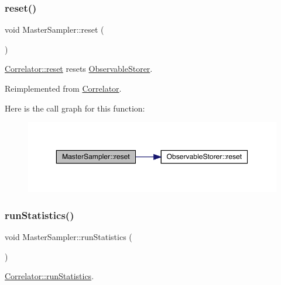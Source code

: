 \subsubsection{\texorpdfstring{reset()}{reset()}}
{\footnotesize\ttfamily void Master\+Sampler\+::reset (\begin{DoxyParamCaption}{ }\end{DoxyParamCaption})\hspace{0.3cm}{\ttfamily [virtual]}}



\mbox{\hyperlink{class_correlator_aacca40262d2cd62f0a3964e832f948c1}{Correlator\+::reset}} resets \mbox{\hyperlink{class_observable_storer}{Observable\+Storer}}. 



Reimplemented from \mbox{\hyperlink{class_correlator_aacca40262d2cd62f0a3964e832f948c1}{Correlator}}.

Here is the call graph for this function\+:
\nopagebreak
\begin{figure}[H]
\begin{center}
\leavevmode
\includegraphics[width=350pt]{class_master_sampler_a275a032513db03c899056fd07d71cc89_cgraph}
\end{center}
\end{figure}
\mbox{\label{class_master_sampler_ab7913d0dbdea57af3f469a3cdd74f8fc}} 
\subsubsection{\texorpdfstring{runStatistics()}{runStatistics()}}
{\footnotesize\ttfamily void Master\+Sampler\+::run\+Statistics (\begin{DoxyParamCaption}{ }\end{DoxyParamCaption})\hspace{0.3cm}{\ttfamily [virtual]}}



\mbox{\hyperlink{class_correlator_a35197b1d12b62ef30b79c0138a26456e}{Correlator\+::run\+Statistics}}. 

